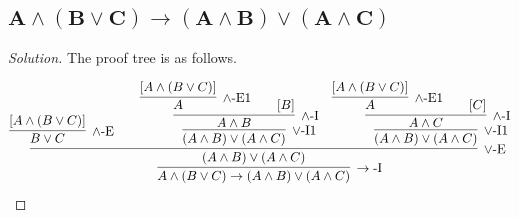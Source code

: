 \documentclass{article}
\newenvironment{solution}{\begin{proof}[\noindent\it Solution]}{\end{proof}}
\begin{document}
\subsection{$\boldsymbol{A\land(B\lor C)\to (A\land B)\lor (A\land C)}$}
\vspace{1em}
\begin{solution}
    The proof tree is as follows.

    \vspace{-1.5em}
    \begin{align*}
        \infer[\to\text{-I}]
        {A\land(B\lor C)\to (A\land B)\lor (A\land C)}
        {\infer[\lor\text{-E}]
            {(A\land B)\lor (A\land C)}
            {
                \infer[\land\text{-E}]
                {B\lor C}
                {[A\land(B\lor C)]}
                &
                \quad
                \infer[\lor\text{-I1}]
                {(A\land B)\lor (A\land C)}
                {
                    \infer[\land\text{-I}]
                    {A\land B}
                    {
                        \infer[\land\text{-E1}]
                        {A}
                        {[A\land(B\lor C)]}
                        & \quad
                        [B]
                    }
                }
                &
                \infer[\lor\text{-I1}]
                {(A\land B)\lor (A\land C)}
                {
                    \infer[\land\text{-I}]
                    {A\land C}
                    {
                        \infer[\land\text{-E1}]
                        {A}
                        {[A\land(B\lor C)]}
                        & \quad
                        [C]
                    }
                }
            }
        }
    \end{align*}
    
\vspace{-3.6em}
\end{solution}

\vspace{1em}
\end{document}
